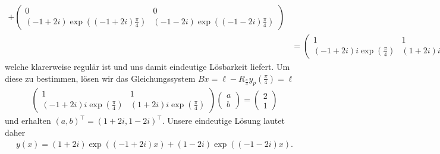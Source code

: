 \begin{solution}
\begin{enumerate}[label = \textbf{\alph*)}]
\begin{align*}
    +
    \begin{pmatrix}
       0 & 0\\ (-1 + 2i)\exp((-1 + 2i)\frac{\pi}{4}) & (-1 -2i)\exp((-1 - 2i)\frac{\pi}{4})
    \end{pmatrix} \\
    &= \begin{pmatrix}
      1 & 1\\
      (-1 + 2i)i\exp(\frac{\pi}{4}) & (1 + 2i)i\exp(\frac{\pi}{4})
    \end{pmatrix},
  \end{align*}
  welche klarerweise regulär ist und uns damit eindeutige Lösbarkeit liefert.
  Um diese zu bestimmen, lösen wir das Gleichungssystem $Bx = \ell - R_{\frac{\pi}{4}}y_p(\frac{\pi}{4}) = \ell$
  \begin{align*}
    \begin{pmatrix}
      1 & 1\\
      (-1 + 2i)i\exp(\frac{\pi}{4}) & (1 + 2i)i\exp(\frac{\pi}{4})
    \end{pmatrix}
    \begin{pmatrix}
      a \\ b
    \end{pmatrix} =
    \begin{pmatrix}
      2 \\ 1
    \end{pmatrix}
    \end{align*}
  und erhalten $(a,b)^{\top} = (1+2i,1-2i)^{\top}$. Unsere eindeutige Lösung lautet daher
  \begin{align*}
    y(x) = (1+2i)\exp((-1 + 2i)x) + (1-2i)\exp((-1-2i)x).
  \end{align*}
\end{enumerate}
\end{solution}
